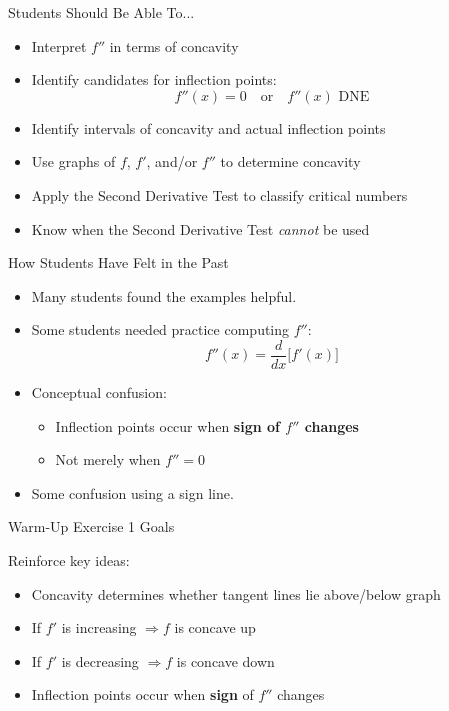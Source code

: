 \documentclass[dvipsnames]{beamer}
\begin{document}
\begin{frame}{Students Should Be Able To...}

\begin{itemize}
\item Interpret $f''$ in terms of concavity
\item Identify candidates for inflection points:
\[
f''(x)=0 \quad \text{or} \quad f''(x) \text{ DNE}
\]
\item Identify intervals of concavity and actual inflection points
\item Use graphs of $f$, $f'$, and/or $f''$ to determine concavity
\item Apply the Second Derivative Test to classify critical numbers
\item Know when the Second Derivative Test \emph{cannot} be used
\end{itemize}
\end{frame}

\begin{frame}{How Students Have Felt in the Past}

\begin{itemize}
\item Many students found the examples helpful.
\item Some students needed practice computing $f''$:
\[
f''(x)=\frac{d}{dx}\big[f'(x)\big]
\]
\item Conceptual confusion:
\begin{itemize}
    \item Inflection points occur when \textbf{sign of $f''$ changes}
    \item Not merely when $f''=0$
\end{itemize}
\item Some confusion using a sign line.
\end{itemize}
\end{frame}

\begin{frame}{Warm-Up Exercise 1 Goals}

Reinforce key ideas:

\begin{itemize}
\item Concavity determines whether tangent lines lie above/below graph
\item If $f'$ is increasing $\Rightarrow f$ is concave up
\item If $f'$ is decreasing $\Rightarrow f$ is concave down
\item Inflection points occur when \textbf{sign} of $f''$ changes
\end{itemize}
\end{frame}
\end{document}
